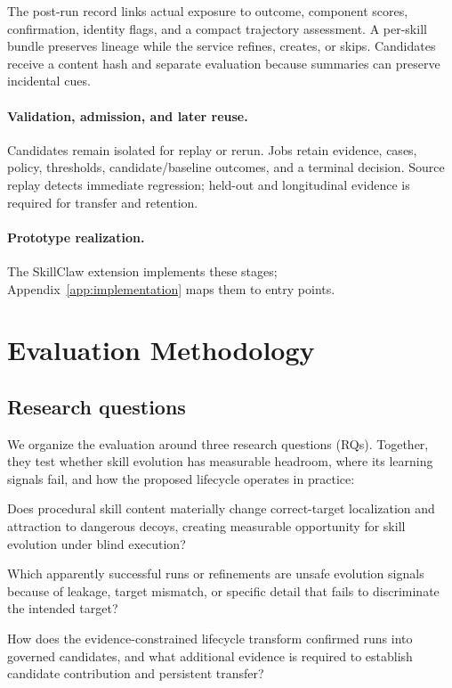 \documentclass[11pt]{article}
\begin{document}
The post-run record links actual exposure to outcome, component scores, confirmation,
identity flags, and a compact trajectory assessment.  A per-skill bundle preserves
lineage while the service refines, creates, or skips.  Candidates receive a content hash
and separate evaluation because summaries can preserve incidental cues.

\paragraph{Validation, admission, and later reuse.}

Candidates remain isolated for replay or rerun.  Jobs retain evidence, cases, policy,
thresholds, candidate/baseline outcomes, and a terminal decision.  Source replay detects
immediate regression; held-out and longitudinal evidence is required for transfer and
retention.

\paragraph{Prototype realization.}

The SkillClaw extension implements these stages; Appendix~\ref{app:implementation} maps
them to entry points.

\section{Evaluation Methodology}
\label{sec:methodology}

\subsection{Research questions}

We organize the evaluation around three research questions (RQs).  Together, they test
whether skill evolution has measurable headroom, where its learning signals fail, and
how the proposed lifecycle operates in practice:
\begin{description}[leftmargin=1.2cm,style=nextline]
    \item[RQ1.] Does procedural skill content materially change correct-target
    localization and attraction to dangerous decoys, creating measurable opportunity
    for skill evolution under blind execution?
    \item[RQ2.] Which apparently successful runs or refinements are unsafe evolution
    signals because of leakage, target mismatch, or specific detail that fails to
    discriminate the intended target?
    \item[RQ3.] How does the evidence-constrained lifecycle transform confirmed runs into
    governed candidates, and what additional evidence is required to establish candidate
    contribution and persistent transfer?
\end{description}
\end{document}
